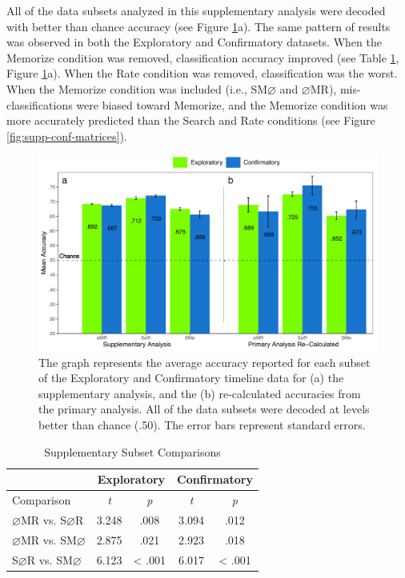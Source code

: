 \documentclass[
  english,
  man, donotrepeattitle,floatsintext]{apa6}
\begin{document}
All of the data subsets analyzed in this supplementary analysis were decoded with better than chance accuracy (see Figure \ref{fig:supp-chance}a). The same pattern of results was observed in both the Exploratory and Confirmatory datasets. When the Memorize condition was removed, classification accuracy improved (see Table \ref{tab:supp-comparisons}, Figure \ref{fig:supp-chance}a). When the Rate condition was removed, classification was the worst. When the Memorize condition was included (i.e., SM\(\varnothing\) and \(\varnothing\)MR), mis-classifications were biased toward Memorize, and the Memorize condition was more accurately predicted than the Search and Rate conditions (see Figure \ref{fig:supp-conf-matrices}).

\begin{figure}
\centering
\includegraphics{figures/supp_analysis/supp_subset_chance.pdf}
\caption{\label{fig:supp-chance}The graph represents the average accuracy reported for each subset of the Exploratory and Confirmatory timeline data for (a) the supplementary analysis, and the (b) re-calculated accuracies from the primary analysis. All of the data subsets were decoded at levels better than chance (.50). The error bars represent standard errors.}
\end{figure}

\begin{table}[!h]
    \centering
    \caption{Supplementary Subset Comparisons}
    \label{tab:supp-comparisons}
    \begin{tabular}{l c c c c}
         & \multicolumn{2}{c}{Exploratory} & \multicolumn{2}{c}{Confirmatory} \\
        \hline
        Comparison & \textit{t} & \multicolumn{1}{c|}{\textit{p}} & \textit{t} & \textit{p} \\
        \hline
        $\varnothing$MR vs. S$\varnothing$R & 3.248 & \multicolumn{1}{c|}{.008} & 3.094 & .012 \\
        $\varnothing$MR vs. SM$\varnothing$ & 2.875 & \multicolumn{1}{c|}{.021} & 2.923 & .018 \\
        S$\varnothing$R vs. SM$\varnothing$ & 6.123 & \multicolumn{1}{c|}{< .001} & 6.017 & < .001 \\
        \hline
    \end{tabular}
\end{table}
\end{document}
